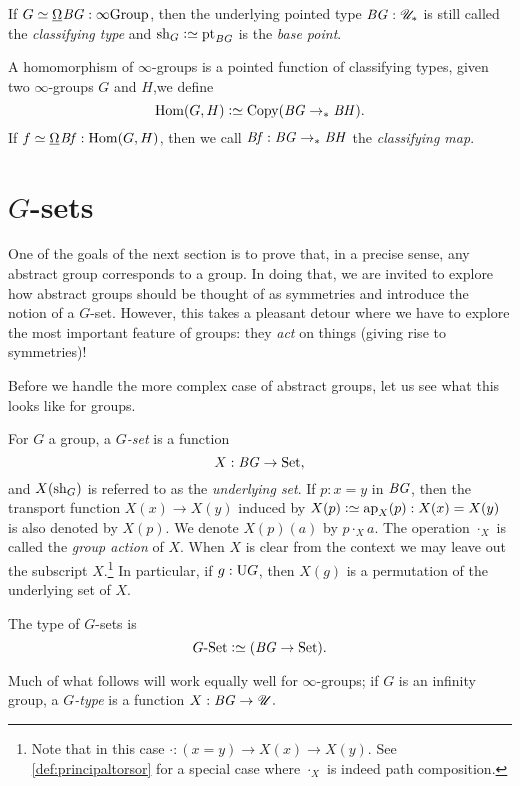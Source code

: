 \begin{definition}\label{def:classifyingspace}
  If $G \jdeq \mkgroup\BG:\typeinftygp$,
  then the underlying pointed type $\mathit{B}\mathit{G} : {\mathscr{U}_*}$
  is still called the  \emph{classifying type} and $\sh_G\defequi \pt_{\BG}$
  is the \emph{base point}.  
\end{definition}
\begin{definition}
  A homomorphism of $\infty$-groups is a pointed function of classifying types, \ie
  given two $\infty$-groups $G$ and $H$,we define
  \[
    \Hom(G,H)\defequi\Copy(\BG\ptdto\BH).
  \]
  If $f \jdeq \mkhom\Bf: \Hom(G,H)$, then we call
  $\mathit{B}\mathit{f} : \mathit{B}\mathit{G}\to_\ast\mathit{B}\mathit{H}$ the \emph{classifying map}.
\end{definition}

\section{$G$-sets}
\label{sec:gsets}

One of the goals of the next section is to prove that, in a precise sense, any abstract group corresponds to a group.  In doing that, we are invited to explore how abstract groups should be thought of as symmetries and introduce the notion of a $G$-set.  However, this takes a pleasant detour where we have to explore the most important feature of groups: they \emph{act} on things (giving rise to symmetries)!

Before we handle the more complex case of abstract groups, 
let us see what this looks like for groups.

\begin{definition}
  For $G$ a group, a \emph{$G$-set} is a function
  $$X : \mathit{B}\mathit{G}\to\mathrm{Set},$$
and $X(\mathrm{sh}_G)$ is referred to as the \emph{underlying set}.
If $p:x=y$ in $\mathit{B}\mathit{G}$, then the transport function $X(x)\to X(y)$ induced
by $X(p)\defeq\ap{X}(p) : X(x)=X(y)$ is also denoted by $X(p)$.
We denote $X(p)(a)$ by $p\cdot_X a$.
The operation $\cdot_X$ is called the \emph{group action} of $X$.
When $X$ is clear from the context we may leave out the 
subscript $X$.\footnote{%
Note that in this case $\cdot: (x=y)\to X(x) \to X(y)$. 
See \cref{def:principaltorsor} for a special case 
where $\cdot_X$ is indeed path composition.}
In particular, if $g:\mathrm{U} G$, 
then $X(g)$ is a permutation of the underlying set of $X$. 

The type of $G$-sets is $$\GSet\defequi(\BG\to\Set).$$
\end{definition}
\begin{remark}
  Much of what follows will work equally well for $\infty$-groups; if $G$ is an infinity group, a \emph{$G$-type} is a function $X : \mathit{B}\mathit{G}\to{\mathscr{U}}.$
\end{remark}

